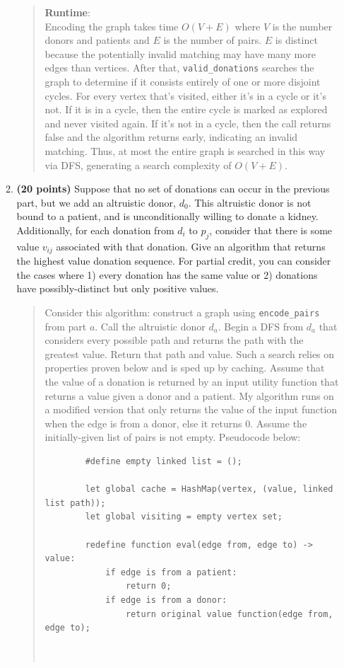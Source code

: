 \documentclass[11pt]{article}
\begin{document}
\begin{enumerate}
\begin{enumerate}
\begin{quote}
  \medskip
  \textbf{Runtime}: \\ 
  Encoding the graph takes time $O(V + E)$ where $V$ is the number donors and patients and $E$ is the number of pairs. $E$ is distinct because the potentially invalid matching may have many more edges than vertices. After that, \texttt{valid\_donations} searches the graph to determine if it consists entirely of one or more disjoint cycles. For every vertex that's visited, either it's in a cycle or it's not. If it is in a cycle, then the entire cycle is marked as explored and never visited again. If it's not in a cycle, then the call returns false and the algorithm returns early, indicating an invalid matching. Thus, at most the entire graph is searched in this way via DFS, generating a search complexity of $O(V + E)$. 
      \end{quote}
    \item {\bf (20 points)} Suppose that no set of donations can occur in the previous part, but we add an altruistic donor, $d_0$. This altruistic donor is not bound to a patient, and is unconditionally willing to donate a kidney. Additionally, for each donation from $d_i$ to $p_j$, consider that there is some value $v_{ij}$ associated with that donation. Give an algorithm that returns the highest value donation sequence. For partial credit, you can consider the cases where 1) every donation has the same value or 2) donations have possibly-distinct but only positive values. 
      \begin{quote}
        \color{purple}
        Consider this algorithm: construct a graph using \texttt{encode\_pairs} from part $a$. Call the altruistic donor $d_a$. Begin a DFS from $d_a$ that considers every possible path and returns the path with the greatest value. Return that path and value. Such a search relies on properties proven below and is sped up by caching. Assume that the value of a donation is returned by an input utility function that returns a value given a donor and a patient. My algorithm runs on a modified version that only returns the value of the input function when the edge is from a donor, else it returns 0. Assume the initially-given list of pairs is not empty. Pseudocode below: 
        \begin{verbatim}
        #define empty linked list = ();

        let global cache = HashMap(vertex, (value, linked list path));
        let global visiting = empty vertex set;

        redefine function eval(edge from, edge to) -> value:
            if edge is from a patient:
                return 0;
            if edge is from a donor:
                return original value function(edge from, edge to);



\end{verbatim}
\end{quote}
\end{enumerate}
\end{enumerate}
\end{document}
